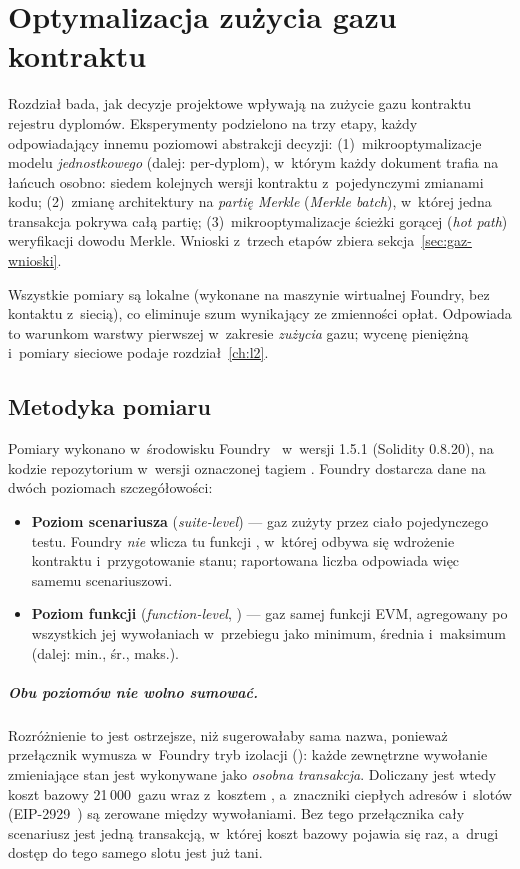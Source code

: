\chapter{Optymalizacja zużycia gazu kontraktu}
\label{ch:gaz}

Rozdział bada, jak decyzje projektowe wpływają na zużycie gazu kontraktu rejestru
dyplomów. Eksperymenty podzielono na trzy etapy, każdy odpowiadający innemu
poziomowi abstrakcji decyzji: (1)~mikrooptymalizacje modelu \emph{jednostkowego}
(dalej: per-dyplom), w~którym każdy dokument trafia na łańcuch osobno: siedem
kolejnych wersji kontraktu z~pojedynczymi zmianami kodu; (2)~zmianę architektury
na \emph{partię Merkle} (\emph{Merkle batch}), w~której jedna transakcja pokrywa
całą partię; (3)~mikrooptymalizacje ścieżki gorącej (\emph{hot path}) weryfikacji
dowodu Merkle. Wnioski z~trzech etapów zbiera sekcja~\ref{sec:gaz-wnioski}.

Wszystkie pomiary są lokalne (wykonane na maszynie wirtualnej Foundry, bez
kontaktu z~siecią), co eliminuje szum wynikający ze zmienności opłat. Odpowiada
to warunkom warstwy pierwszej w~zakresie \emph{zużycia} gazu; wycenę pieniężną
i~pomiary sieciowe podaje rozdział~\ref{ch:l2}.

\section{Metodyka pomiaru}
\label{sec:gaz-metodyka}

Pomiary wykonano w~środowisku Foundry~\cite{foundry} w~wersji 1.5.1
(Solidity 0.8.20), na kodzie repozytorium w~wersji oznaczonej tagiem
. Foundry
dostarcza dane na dwóch poziomach szczegółowości:

\begin{itemize}
  \item \textbf{Poziom scenariusza} (\emph{suite-level}) --- gaz zużyty przez
        ciało pojedynczego testu. Foundry \emph{nie} wlicza tu funkcji
        , w~której odbywa się wdrożenie kontraktu i~przygotowanie
        stanu; raportowana liczba odpowiada więc samemu scenariuszowi.
  \item \textbf{Poziom funkcji} (\emph{function-level}, ) ---
        gaz samej funkcji EVM, agregowany po wszystkich jej wywołaniach
        w~przebiegu jako minimum, średnia i~maksimum (dalej: min., śr., maks.).
\end{itemize}

\paragraph{Obu poziomów nie wolno sumować.} Rozróżnienie to jest ostrzejsze, niż
sugerowałaby sama nazwa, ponieważ przełącznik  wymusza
w~Foundry tryb izolacji (): każde zewnętrzne wywołanie
zmieniające stan jest wykonywane jako \emph{osobna transakcja}. Doliczany jest
wtedy koszt bazowy 21\,000~gazu wraz z~kosztem , a~znaczniki
ciepłych adresów i~slotów (EIP-2929~\cite{eip2929}) są zerowane między
wywołaniami. Bez tego przełącznika cały scenariusz jest jedną transakcją,
w~której koszt bazowy pojawia się raz, a~drugi dostęp do tego samego slotu jest
już tani.

